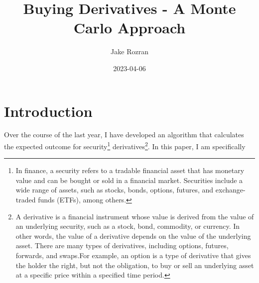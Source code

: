 \documentclass[
]{book}
\title{Buying Derivatives - A Monte Carlo Approach}
\author{Jake Rozran}
\date{2023-04-06}
\begin{document}
\maketitle

{
\setcounter{tocdepth}{1}
\tableofcontents
}
\hypertarget{introduction}{%
\chapter{Introduction}\label{introduction}}

Over the course of the last year, I have developed an algorithm that calculates
the expected outcome for security\footnote{In finance, a security refers to
  a tradable financial asset that has monetary value and can be bought or sold in
  a financial market. Securities include a wide range of assets, such as stocks,
  bonds, options, futures, and exchange-traded funds (ETFs), among others.}
derivatives\footnote{A derivative is a financial instrument whose value is derived from
  the value of an underlying security, such as a stock, bond, commodity, or currency.
  In other words, the value of a derivative depends on the value of the
  underlying asset. There are many types of derivatives, including options,
  futures, forwards, and swaps.For example, an option is a type of
  derivative that gives the holder the right, but not the obligation, to buy or
  sell an underlying asset at a specific price within a specified time period.}.
In this paper, I am specifically
\end{document}
